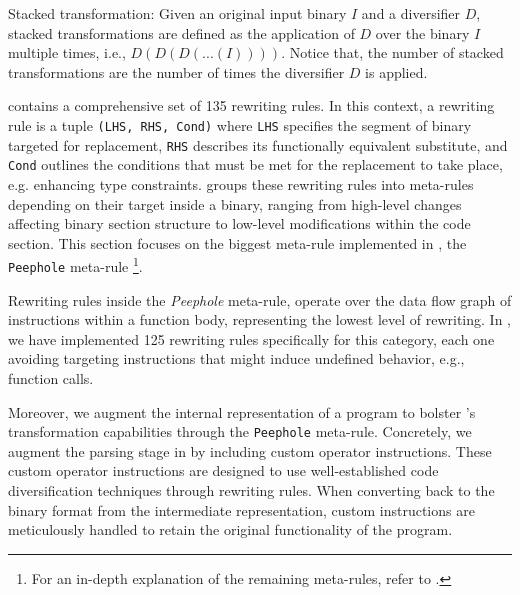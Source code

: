 \begin{definition}{Stacked transformation:}\label{stack_transform}
    Given an original input \Wasm binary $I$ and a diversifier $D$, stacked transformations are defined as the application of $D$ over the binary $I$ multiple times, i.e., $D(D(D(...(I))))$.  Notice that, the number of stacked transformations are the number of times the diversifier $D$ is applied.
\end{definition}


\label{custom}

\tool contains a comprehensive set of 135 rewriting rules.
In this context, a rewriting rule is a tuple \texttt{(LHS, RHS, Cond)} where \texttt{LHS} specifies the segment of binary targeted for replacement, \texttt{RHS} describes its functionally equivalent substitute, and \texttt{Cond} outlines the conditions that must be met for the replacement to take place, e.g. enhancing type constraints.
\tool groups these rewriting rules into meta-rules depending on their target inside a \wasm binary, ranging from high-level changes affecting binary section structure to low-level modifications within the code section. 
This section focuses on the biggest meta-rule implemented in \tool, the \texttt{Peephole} meta-rule \footnote{For an in-depth explanation of the remaining meta-rules, refer to \cite{wasmmutate}.}. 

Rewriting rules inside the \emph{Peephole} meta-rule, operate over the data flow graph of instructions within a function body, representing the lowest level of rewriting.  
In \tool, we have implemented 125 rewriting rules specifically for this category, each one avoiding targeting instructions that might induce undefined behavior, e.g., function calls.

Moreover, we augment the internal representation of a \wasm program to bolster \tool's transformation capabilities through the \texttt{Peephole} meta-rule.
Concretely, we augment the parsing stage in \tool by including custom operator instructions.
These custom operator instructions are designed to use well-established code diversification techniques through rewriting rules.
When converting back to the \Wasm binary format from the intermediate representation, custom instructions are meticulously handled to retain the original functionality of the \Wasm program. 


